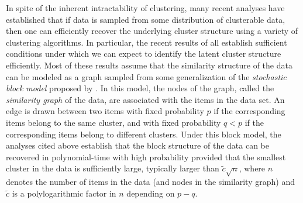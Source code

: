\documentclass[twoside,11pt]{article}
\newcommand{\0}{\bs{0}}
\begin{document}
In spite of the inherent intractability of clustering, %
many recent analyses have established that if
data is sampled from some distribution of clusterable data, then one can efficiently recover the underlying
cluster structure using a variety of clustering algorithms.
In particular, the recent results of \citet{ abbe2016exact,  ailon2013breaking, ames2014convex, ames2014guaranteed, amini2014semidefinite, cai2015robust, chen2014clustering, chen2014improved, chen2014statistical, guedon2015community, hajek2015achieving,
lei2015consistency,  mathieu2010correlation,nellore2013recovery, oymak2011finding,rohe2011spectral, qin2013regularized, vinayak2014sharp} all establish sufficient conditions  under which we can expect to identify the latent cluster structure efficiently.
Most of these results assume that the similarity structure of the data can be
modeled as a graph sampled from some
generalization of the
\emph{stochastic block model} proposed by \citet{holland1983stochastic}. In this model, the nodes of the graph, called the \emph{similarity graph} of the data, are associated with the items in the data set. An edge is drawn between two items with fixed probability $p$ if the corresponding items belong to the same cluster, and with fixed probability $q < p$ if the corresponding items belong to different clusters. %
Under this block model, the analyses cited above establish
 that the block structure of the data can be recovered in polynomial-time
 with high probability
provided that the smallest cluster in the data is sufficiently large, typically larger than \( \tilde c \sqrt{n} \), where \(n\)
denotes the number of items in the data (and nodes in the similarity graph) and \(\tilde c \) is a polylogarithmic factor in \(n\)
depending on \(p - q \).
\end{document}
